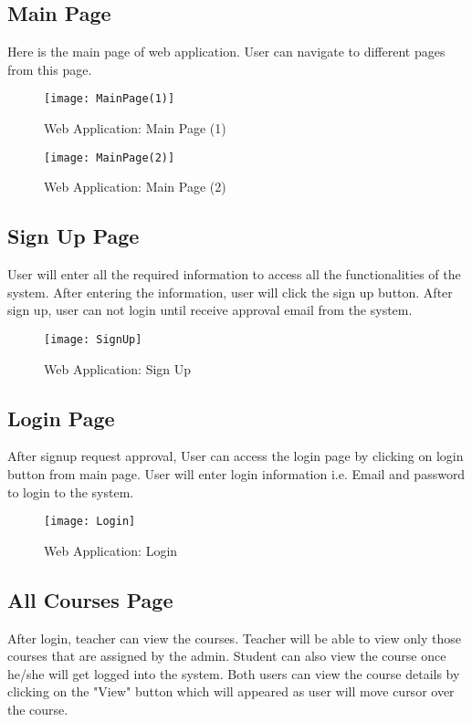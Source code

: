 \subsection{Main Page}
Here is the main page of web application. User can navigate to different pages from this page. 

\begin{figure}[h]
  \centering
  \texttt{[image: MainPage(1)]}
  \caption{Web Application: Main Page (1)}
\end{figure}

\begin{figure}[h]
  \centering
  \texttt{[image: MainPage(2)]}
  \caption{Web Application: Main Page (2)}
\end{figure}

\newpage

\subsection{Sign Up Page}
User will enter all the required information to access all the functionalities of the system. After entering the information, user will click the sign up button. After sign up, user can not login until receive approval email from the system.

\begin{figure}[h]
  \centering
  \texttt{[image: SignUp]}
  \caption{Web Application: Sign Up}
\end{figure}

\subsection{Login Page}
After signup request approval, User can access the login page by clicking on login button from main page.  User will enter login information i.e. Email and password to login to the system.

\begin{figure}[h]
  \centering
  \texttt{[image: Login]}
  \caption{Web Application: Login}
\end{figure}

\subsection{All Courses Page}
After login, teacher can view the courses. Teacher will be able to view only those courses that are assigned by the admin. Student can also view the course once he/she will get logged into the system. Both users can view the course details by clicking on the "View" button which will appeared as user will move cursor over the course.

